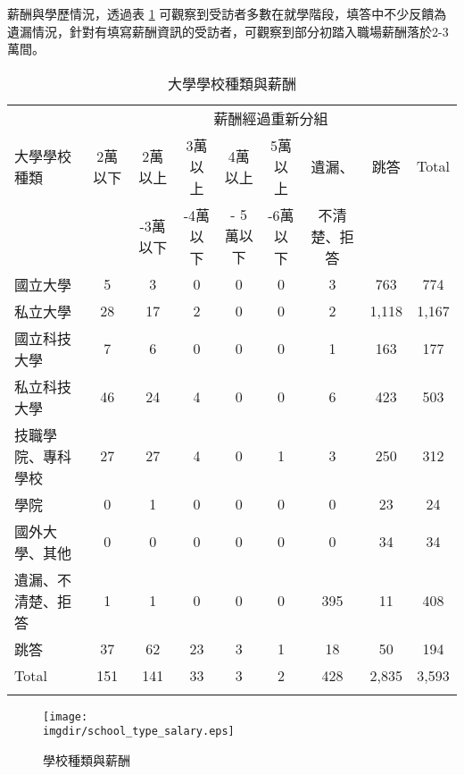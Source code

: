 \documentclass[12pt, a4paper]{article}
\begin{document}
薪酬與學歷情況，透過表 \ref{tab:school_wage} 可觀察到受訪者多數在就學階段，填答中不少反饋為遺漏情況，針對有填寫薪酬資訊的受訪者，可觀察到部分初踏入職場薪酬落於2-3萬間。
\begin{table}[ht]
\centering
\renewcommand{\arraystretch}{1.3} %
\extrarowheight=4pt
\caption{大學學校種類與薪酬}
\begin{adjustbox}{width=\textwidth}
\begin{tabular}{l*{8}{c}}
\toprule
& \multicolumn{8}{c}{薪酬經過重新分組} \\
\cmidrule(lr){2-9}
大學學校種類 & 2萬以下 & 2萬以上& 3萬以上 & 4萬以上 & 5萬以上 & 遺漏、 & 跳答 & Total \\
		   &    &-3萬以下    & -4萬以下  &- 5萬以下    & -6萬以下   & 不清楚、拒答   &   &  \\
\midrule
國立大學 & 5 & 3 & 0 & 0 & 0 & 3 & 763 & 774 \\
私立大學 & 28 & 17 & 2 & 0 & 0 & 2 & 1,118 & 1,167 \\
國立科技大學 & 7 & 6 & 0 & 0 & 0 & 1 & 163 & 177 \\
私立科技大學 & 46 & 24 & 4 & 0 & 0 & 6 & 423 & 503 \\
技職學院、專科學校 & 27 & 27 & 4 & 0 & 1 & 3 & 250 & 312 \\
學院 & 0 & 1 & 0 & 0 & 0 & 0 & 23 & 24 \\
國外大學、其他 & 0 & 0 & 0 & 0 & 0 & 0 & 34 & 34 \\
遺漏、不清楚、拒答 & 1 & 1 & 0 & 0 & 0 & 395 & 11 & 408 \\
跳答 & 37 & 62 & 23 & 3 & 1 & 18 & 50 & 194 \\
Total & 151 & 141 & 33 & 3 & 2 & 428 & 2,835 & 3,593 \\
\bottomrule
\label{tab:school_wage}
\end{tabular}
\end{adjustbox}
\end{table}



\begin{figure}[H]
    \centering    
        \texttt{[image: \\imgdir/school\_type\_salary.eps]}
        \caption{學校種類與薪酬}
        \label{pic:school_salary}
\end{figure}
\end{document}
